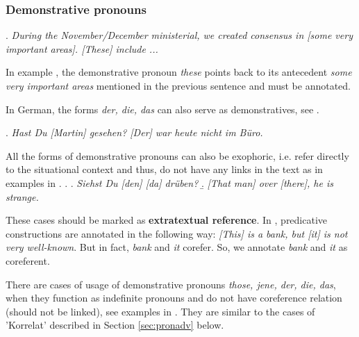 \documentclass[a4paper]{article}
\begin{document}
\subsubsection{Demonstrative pronouns}

\ex.
{\sl During the November/December ministerial, we created consensus in [some very important areas]. [These] include ...}

In example \Last, the demonstrative pronoun {\sl these} points back to its antecedent {\sl some very important areas} mentioned in the previous sentence and must be annotated. 

In German, the forms {\sl der, die, das} can also serve as demonstratives, see \Next.

\ex.
{\sl Hast Du [Martin] gesehen? [Der] war heute nicht im Büro.}

All the forms of demonstrative pronouns can also be exophoric, i.e. refer directly to the situational context and thus, do not have any links in the text as in examples in \Next. %
\ex.
\a. {\sl Siehst Du [den] [da] drüben?}
\b. {\sl [That man] over [there], he is strange.}

These cases should be marked as {\bf extratextual reference}. 
In \cite{GrishinaStedeGuide}, predicative constructions are annotated in the following way: {\sl [This] is a bank, but [it] is not very well-known}. But in fact, {\sl bank} and {\sl it} corefer. %
So, we annotate {\sl bank} and {\sl it} as coreferent. %

There are cases of usage of demonstrative pronouns {\sl those, jene, der, die, das}, when they function as indefinite pronouns and do not have coreference relation (should not be linked), see examples in \Next. They are similar to the cases of 'Korrelat' described in Section \ref{sec:pronadv} below.
\end{document}
